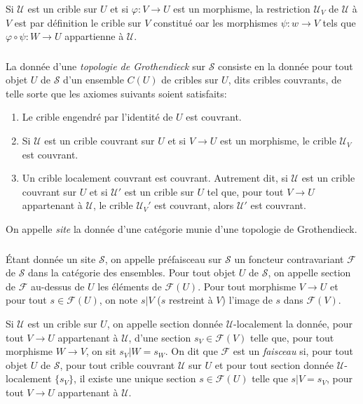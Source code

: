 \documentclass{article}
\newcommand{\cF}{\mathcal{F}}
\newcommand{\cS}{\mathcal{S}}
\newcommand{\cU}{\mathcal{U}}
\begin{document}
Si $\cU$ est un crible sur $U$ et si $\varphi:V\to U$ est un morphisme, la 
restriction $\cU_V$ de $\cU$ à $V$ est par définition le crible sur $V$ 
constitué oar les morphismes $\psi:w\to V$ tels que 
$\varphi\circ\psi:W\to U$ appartienne à $\cU$.





\subsubsection{}\label{1-6-2}

La donnée d'une \emph{topologie de Grothendieck} sur $\cS$ consiste en la 
donnée pour tout objet $U$ de $\cS$ d'un ensemble $C(U)$ de cribles sur $U$, 
dits cribles couvrants, de telle sorte que les axiomes suivants soient 
satisfaits:
\begin{enumerate}[\indent a)]
  \item Le crible engendré par l'identité de $U$ est couvrant.
  \item Si $\cU$ est un crible couvrant sur $U$ et si $V\to U$ est un 
    morphisme, le crible $\cU_V$ est couvrant.
  \item Un crible localement couvrant est couvrant. Autrement dit, si $\cU$ est 
    un crible couvrant sur $U$ et si $\cU'$ est un crible sur $U$ tel que, pour 
    tout $V\to U$ appartenant à $\cU$, le crible $\cU_V'$ est couvrant, alors 
    $\cU'$ est couvrant.
\end{enumerate}

On appelle \emph{site} la donnée d'une catégorie munie d'une topologie de 
Grothendieck.





\subsubsection{}\label{1-6-3}

Étant donnée un site $\cS$, on appelle préfaisceau sur $\cS$ un foncteur 
contravariant $\cF$ de $\cS$ dans la catégorie des ensembles. Pour tout 
objet $U$ de $\cS$, on appelle section de $\cF$ au-dessus de $U$ les 
éléments de $\cF(U)$. Pour tout morphisme $V\to U$ et pour tout 
$s\in \cF(U)$, on note $s|V$ ($s$ restreint à $V$) l'image de $s$ dans 
$\cF(V)$.

Si $\cU$ est un crible sur $U$, on appelle section donnée $\cU$-localement la 
donnée, pour tout $V\to U$ appartenant à $\cU$, d'une section 
$s_V\in\cF(V)$ telle que, pour tout morphisme $W\to V$, on sit $s_V|W=s_W$. On 
dit que $\cF$ est un \emph{faisceau} si, pour tout objet $U$ de $\cS$, pour 
tout crible couvrant $\cU$ sur $U$ et pour tout section donnée 
$\cU$-localement $\{s_V\}$, il existe une unique section $s\in\cF(U)$ telle que 
$s|V=s_V$, pour tout $V\to U$ appartenant à $\cU$. 
\end{document}
